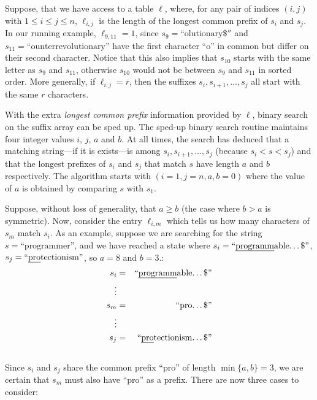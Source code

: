 Suppose, that we have access to a table $\ell$, where, for any
pair of indices $(i,j)$ with $1\le i\le j\le n$, $\ell_{i,j}$ is
the length of the longest common prefix of $s_i$ and $s_j$. In our
running example, $\ell_{9,11}=1$, since $s_9=\text{``olutionary\$}''$
and $s_{11}=\text{``ounterrevolutionary''}$ have the first character
``o'' in common but differ on their second character.  Notice that
this also implies that $s_{10}$ starts with the same letter as $s_9$
and $s_{11}$, otherwise $s_{10}$ would not be between $s_9$ and $s_{11}$
in sorted order.  More generally, if $\ell_{i,j}=r$, then the suffixes
$s_i,s_{i+1},\ldots,s_{j}$ all start with the same $r$ characters.

With the extra \emph{longest common prefix} information provided by
$\ell$, binary search on the suffix array can be sped up.  The sped-up
binary search routine maintains four integer values $i$, $j$, $a$ and $b$.
At all times, the search has deduced that a matching string---if it is
exists---is among $s_i,s_{i+1},\ldots,s_j$ (because $s_i < s < s_j$) and
that the longest prefixes of $s_i$ and $s_j$ that match $s$ have length
$a$ and $b$ respectively. The algorithm starts with $(i=1,j=n,a,b=0)$
where the value of $a$ is obtained by comparing $s$ with $s_1$.

Suppose, without loss of generality, that $a \ge b$ (the case where $b>a$ is symmetric).  Now, consider the entry $\ell_{i,m}$ which tells us how many characters of $s_m$ match $s_i$. 
As an example, suppose we are searching for the string $s=\text{``programmer''}$, and we have reached a state where $s_i=\text{``\uline{programm}able\ldots\$''}$, $s_j=\text{``\uline{pro}tectionism''}$, so $a=8$ and $b=3$.: \\[\parskip]
  \begin{eqnarray*}
     s_i & = & \text{``\uline{programm}able\ldots\$''} \\
     \vdots & \\
     s_m & = & \text{``pro\ldots\$''} \\
     \vdots & \\
     s_j & = & \text{``\uline{pro}tectionism\ldots\$''} \\
  \end{eqnarray*} \\[\parskip]
Since $s_i$ and $s_j$ share the common prefix ``pro'' of length $\min\{a,b\}=3$, we are certain that $s_m$ must also have ``pro'' as a prefix.
There are now three cases to consider:

